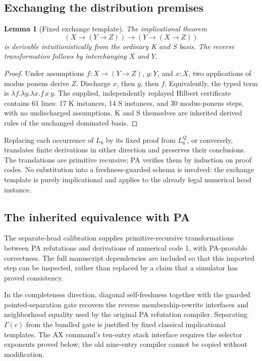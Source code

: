 \documentclass[11pt,letterpaper]{article}
\newtheorem{lemma}[theorem]{Lemma}
\begin{document}
\subsection{Exchanging the distribution premises}
\begin{lemma}[Fixed exchange template]
The implicational theorem
\[
 (X\to(Y\to Z))\to(Y\to(X\to Z))
\]
is derivable intuitionistically from the ordinary K and S basis. The
reverse transformation follows by interchanging $X$ and $Y$.
\end{lemma}
\begin{proof}
Under assumptions $f:X\to(Y\to Z)$, $y:Y$, and $x:X$, two applications
of modus ponens derive $Z$. Discharge $x$, then $y$, then $f$. Equivalently,
the typed term is $\lambda f.\lambda y.\lambda x.f\,x\,y$.
The supplied, independently replayed Hilbert certificate contains 61 lines:
17 K instances, 14 S instances, and 30 modus-ponens steps, with no
undischarged assumptions. K and S themselves are inherited derived rules
of the unchanged dominated basis.
\end{proof}
Replacing each occurrence of $L_6$ by its fixed proof from $L_6^Q$, or
conversely, translates finite derivations in either direction and preserves
their conclusions. The translations are primitive recursive; PA verifies
them by induction on proof codes. No substitution into a freshness-guarded
schema is involved: the exchange template is purely implicational and
applies to the already legal numerical head instance.

\subsection{The inherited equivalence with PA}
The separate-head calibration supplies primitive-recursive transformations
between PA refutations and derivations of numerical code 1, with
PA-provable correctness. The full manuscript dependencies are included
so that this imported step can be inspected, rather than replaced by a
claim that a simulator has proved consistency.

In the completeness direction, diagonal self-freshness together with the
guarded pointed-separation gate recovers the reverse membership-rewrite
interfaces and neighborhood equality used by the original PA refutation
compiler. Separating $\Gamma(c)$ from the bundled gate is justified by
fixed classical implicational templates. The AX command's ten-entry stack
interface requires the selector exponents proved below; the old nine-entry
compiler cannot be copied without modification.
\end{document}
